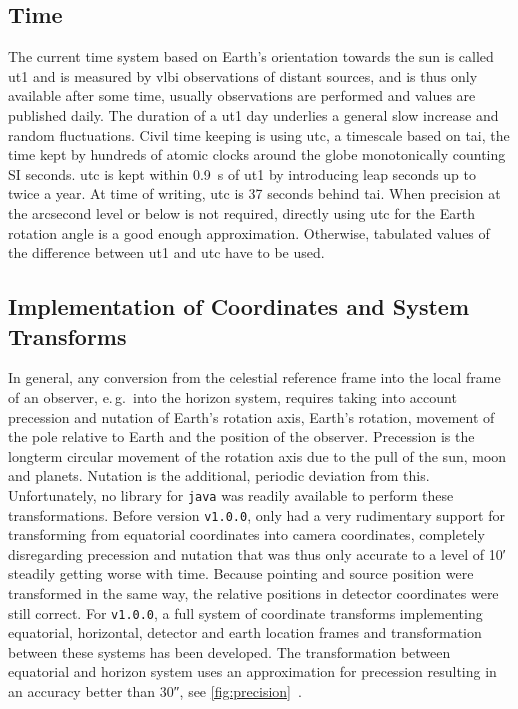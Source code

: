 \subsection{Time}
The current time system based on Earth's orientation towards the sun
is called \gls{ut1} and is measured by \gls{vlbi} observations of distant sources,
and is thus only available after some time, usually observations are performed and values are published daily.
The duration of a \gls{ut1} day underlies a general slow increase and random fluctuations.
Civil time keeping is using \gls{utc}, a timescale based on \gls{tai}, the time
kept by hundreds of atomic clocks around the globe monotonically counting SI seconds.
\gls{utc} is kept within \SI{0.9}{\second} of \gls{ut1} by introducing leap seconds
up to twice a year.
At time of writing, \gls{utc} is 37 seconds behind \gls{tai}.
When precision at the arcsecond level or below is not required, directly 
using \gls{utc} for the Earth rotation angle is a good enough approximation.
Otherwise, tabulated values of the difference between \gls{ut1} and \gls{utc} have
to be used.~\cite[Chapter~3]{expl-suppl}

\subsection{Implementation of Coordinates and System Transforms}
\noindent In general, any conversion from the celestial reference frame into the local
frame of an observer, e.\,g.\  into the horizon system, requires taking into account
precession and nutation of Earth's rotation axis,  Earth's rotation, movement of the pole
relative to Earth and the position of the observer.
Precession is the longterm circular movement of the rotation axis due to the pull of the sun, moon and planets.
Nutation is the additional, periodic deviation from this.
Unfortunately, no library for \texttt{java} was readily available to perform these 
transformations.
Before version \texttt{v1.0.0}, \facttools{} only had a very rudimentary support for
transforming from equatorial coordinates into camera coordinates, completely disregarding
precession and nutation that was thus only accurate to a level of \ang{;10;} steadily getting
worse with time. 
Because pointing and source position were transformed in the same way, the
relative positions in detector coordinates were still correct.
For \texttt{v1.0.0}, a full system of coordinate transforms implementing equatorial,
horizontal, detector and earth location frames and transformation between
these systems has been developed.
The transformation between equatorial and horizon system uses an approximation for
precession resulting in an accuracy better than \ang{;;30}, see \autoref{fig:precision}~\cite{coord-approx}.

